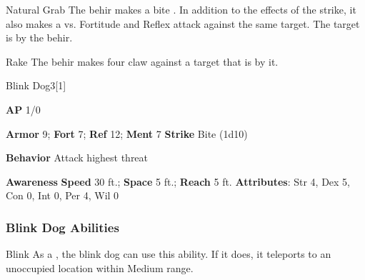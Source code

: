 \vspace{0.5em}
\begin{freeability}{Natural Grab}
The behir makes a bite .
In addition to the effects of the strike, it also makes a  vs. Fortitude and Reflex attack against the same target.
\hit The target is  by the behir.
\end{freeability}

\vspace{0.5em}
\begin{apability}{Rake}
The behir makes four claw  against a target that is  by it.
\end{apability}

\begin{monsection}{Blink Dog}{3}[1]
\vspace{-1em}\vspace{-1em}
\begin{spellcontent}
\begin{spelltargetinginfo}
{\textbf{AP} 1/0}

\pari \textbf{Armor} 9;
\textbf{Fort} 7;
\textbf{Ref} 12;
\textbf{Ment} 7
\pari \textbf{Strike} Bite  (1d10)



\pari \textbf{Behavior} Attack highest threat
\end{spelltargetinginfo}
\end{spellcontent}

\begin{monsterfooter}
\pari \textbf{Awareness} 
\pari \textbf{Speed} 30 ft.;
\textbf{Space} 5 ft.;
\textbf{Reach} 5 ft.
\pari \textbf{Attributes}:
Str 4,
Dex 5,
Con 0,
Int 0,
Per 4,
Wil 0
\end{monsterfooter}
\end{monsection}


\subsubsection{Blink Dog Abilities}

\begin{freeability}{Blink}
As a , the blink dog can use this ability.
If it does, it teleports to an unoccupied location within Medium range.
\end{freeability}

